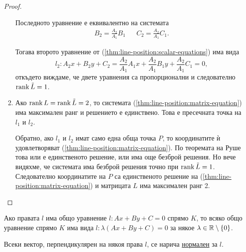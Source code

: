 \documentclass[numbers=endperiod, DIV=15]{scrartcl}
\begin{document}
\begin{proof}
\begin{enumerate}
    Последното уравнение е еквивалентно на системата
    \begin{align*}
      B_2 = \frac {A_2} {A_1} B_1
      &&
      C_2 = \frac {A_2} {A_1} C_1.
    \end{align*}

    Тогава второто уравнение от (\ref{thm:line-position:scalar-equations}) има вида
    \begin{displaymath}
      l_2:
      A_2 x + B_2 y + C_2 =
      \frac {A_2} {A_1} A_1 x + \frac {A_2} {A_1} B_1 y + \frac {A_2} {A_1} C_1
      = 0,
    \end{displaymath}
    откъдето виждаме, че двете уравнения са пропорционални и следователно $\operatorname{rank} \tilde L = 1$.

    \item Ако $\operatorname{rank} L = \operatorname{rank} \tilde L = 2$, то системата (\ref{thm:line-position:matrix-equation}) има максимален ранг и решението е единствено. Това е пресечната точка на $l_1$ и $l_2$.

    Обратно, ако $l_1$ и $l_2$ имат само една обща точка $P$, то координатите ѝ удовлетворяват (\ref{thm:line-position:matrix-equation}). По теоремата на Руше това или е единственото решение, или има още безброй решения. Но вече видяхме, че системата има безброй решения точно при $\operatorname{rank} \tilde L = 1$. Следователно координатите на $P$ са единственото решение на (\ref{thm:line-position:matrix-equation}) и матрицата $L$ има максимален ранг 2.
  \end{enumerate}
\end{proof}

\begin{corollary}
  Ако правата $l$ има общо уравнение $l: Ax + By + C = 0$ спрямо $K$, то всяко общо уравнение спрямо $K$ има вида $l: \lambda(Ax + By + C) = 0$ за някое $\lambda \in \mathbb{R} \setminus \{ 0 \}$.
\end{corollary}

\begin{definition}
  Всеки вектор, перпендикулярен на някоя права $l$, се нарича \underline{нормален} за $l$.
\end{definition}
\end{document}
